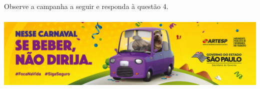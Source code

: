 






Observe a campanha a seguir e responda à questão 4.

\includegraphics[width=5.90551in,height=1.47222in]{./imgSAEB_7_POR/media/image10.png}


